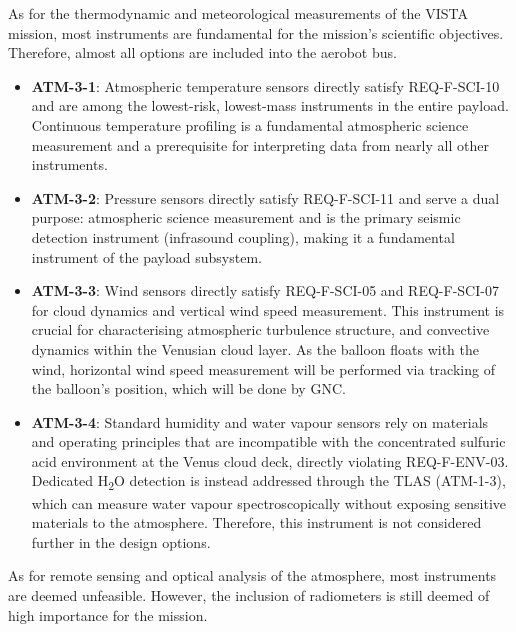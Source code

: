 As for the thermodynamic and meteorological measurements of the VISTA mission, most instruments are fundamental for the mission's scientific objectives. Therefore, almost all options are included into the aerobot bus.

\begin{itemize}
    \item \textbf{ATM-3-1}: Atmospheric temperature sensors directly satisfy REQ-F-SCI-10 and are among the lowest-risk, lowest-mass instruments in the entire payload. Continuous temperature profiling is a fundamental atmospheric science measurement and a prerequisite for interpreting data from nearly all other instruments.

    \item \textbf{ATM-3-2}: Pressure sensors directly satisfy REQ-F-SCI-11 and serve a dual purpose: atmospheric science measurement and is the primary seismic detection instrument (infrasound coupling), making it a fundamental instrument of the payload subsystem.

    \item \textbf{ATM-3-3}: Wind sensors directly satisfy REQ-F-SCI-05 and REQ-F-SCI-07 for cloud dynamics and vertical wind speed measurement. This instrument is crucial for characterising atmospheric turbulence structure, and convective dynamics within the Venusian cloud layer. As the balloon floats with the wind, horizontal wind speed measurement will be performed via tracking of the balloon's position, which will be done by GNC.  

    \item \textbf{ATM-3-4}: Standard humidity and water vapour sensors rely on materials and operating principles that are incompatible with the concentrated sulfuric acid environment at the Venus cloud deck, directly violating REQ-F-ENV-03. Dedicated H\textsubscript{2}O detection is instead addressed through the TLAS (ATM-1-3), which can measure water vapour spectroscopically without exposing sensitive materials to the atmosphere. Therefore, this instrument is not considered further in the design options.
\end{itemize}

As for remote sensing and optical analysis of the atmosphere, most instruments are deemed unfeasible. However, the inclusion of radiometers is still deemed of high importance for the mission. 

